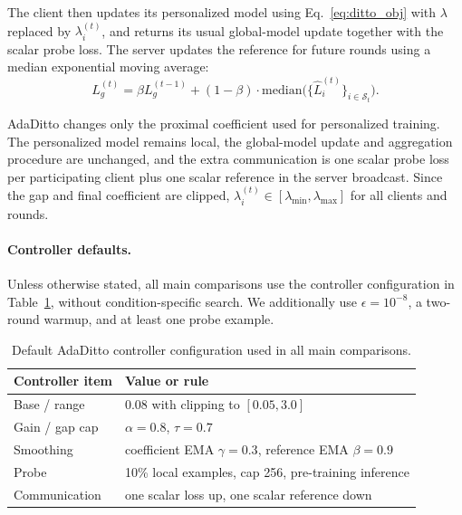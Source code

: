\documentclass[letterpaper]{article} %
\begin{document}
The client then updates its personalized model using Eq.~\ref{eq:ditto_obj} with $\lambda$ replaced by $\lambda_i^{(t)}$, and returns its usual global-model update together with the scalar probe loss. The server updates the reference for future rounds using a median exponential moving average:
\begin{equation}
\label{eq:global_loss}
L_g^{(t)} =
\beta L_g^{(t-1)}
+
(1-\beta)\cdot
\mathrm{median}\big(\{\hat L_i^{(t)}\}_{i\in\mathcal{S}_t}\big).
\end{equation}

AdaDitto changes only the proximal coefficient used for personalized training. The personalized model remains local, the global-model update and aggregation procedure are unchanged, and the extra communication is one scalar probe loss per participating client plus one scalar reference in the server broadcast. Since the gap and final coefficient are clipped, $\lambda_i^{(t)}\in[\lambda_{\min},\lambda_{\max}]$ for all clients and rounds.

\paragraph{Controller defaults.}
Unless otherwise stated, all main comparisons use the controller
configuration in Table~\ref{tab:controller-defaults}, without
condition-specific search. We additionally use $\epsilon=10^{-8}$,
a two-round warmup, and at least one probe example.

\begin{table}[t]
\centering
\scriptsize
\setlength{\tabcolsep}{4pt}
\renewcommand{\arraystretch}{1.08}
\begin{tabularx}{\columnwidth}{@{}lX@{}}
\toprule
Controller item & Value or rule \\
\midrule
Base / range & $0.08$ with clipping to $[0.05,3.0]$ \\
Gain / gap cap & $\alpha=0.8$, $\tau=0.7$ \\
Smoothing & coefficient EMA $\gamma=0.3$, reference EMA $\beta=0.9$ \\
Probe & 10\% local examples, cap 256, pre-training inference \\
Communication & one scalar loss up, one scalar reference down \\
\bottomrule
\end{tabularx}
\caption{Default AdaDitto controller configuration used in all main comparisons.}
\label{tab:controller-defaults}
\end{table}
\end{document}
